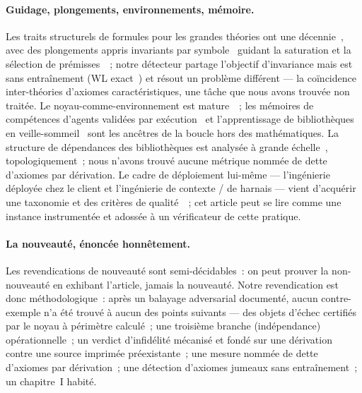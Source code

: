 \documentclass[11pt]{article}
\theoremstyle{remark}\newtheorem{example}{Exemple}
\begin{document}
\paragraph{Guidage, plongements, environnements, mémoire.}
Les traits structurels de formules pour les grandes théories ont une
décennie~\cite{kaliszyk2015features}, avec des plongements appris invariants par
symbole~\cite{olsak2020invariant,jakubuv2020enigma} guidant la saturation et la
sélection de prémisses~\cite{alemi2016deepmath,mikula2023magnushammer}~; notre
détecteur partage l'objectif d'invariance mais est sans entraînement (WL
exact~\cite{shervashidze2011wl}) et résout un problème différent --- la coïncidence
inter-théories d'axiomes caractéristiques, une tâche que nous avons trouvée non
traitée. Le noyau-comme-environnement est
mature~\cite{yang2019coqgym,lample2022htps,polu2020gptf}~; les mémoires de compétences
d'agents validées par exécution~\cite{wang2023voyager} et l'apprentissage de
bibliothèques en veille-sommeil~\cite{ellis2021dreamcoder} sont les ancêtres de la
boucle hors des mathématiques. La structure de dépendances des bibliothèques est
analysée à grande échelle~\cite{mathlibnetwork2026,atlas2026}, topologiquement~; nous
n'avons trouvé aucune métrique nommée de dette d'axiomes par dérivation. Le cadre de
déploiement lui-même --- l'ingénierie déployée chez le client et l'ingénierie de
contexte / de harnais --- vient d'acquérir une taxonomie et des critères de
qualité~\cite{fde2026taxonomy,contextengineering2026}~; cet article peut se lire comme
une instance instrumentée et adossée à un vérificateur de cette pratique.

\paragraph{La nouveauté, énoncée honnêtement.}
Les revendications de nouveauté sont semi-décidables~: on peut prouver la non-nouveauté
en exhibant l'article, jamais la nouveauté. Notre revendication est donc
méthodologique~: après un balayage adversarial documenté, aucun contre-exemple n'a été
trouvé à aucun des points suivants --- des objets d'échec certifiés par le noyau à
périmètre calculé~; une troisième branche (indépendance) opérationnelle~; un verdict
d'infidélité mécanisé et fondé sur une dérivation contre une source imprimée
préexistante~; une mesure nommée de dette d'axiomes par dérivation~; une détection
d'axiomes jumeaux sans entraînement~; un chapitre~I habité.

\end{document}
